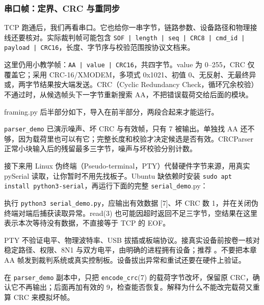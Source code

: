 \subsubsection{串口帧：定界、CRC 与重同步}
TCP 跑通后，我们再看串口。它也给你一串字节，链路参数、设备路径和物理接线还要核对。实际裁判帧可能包含 \texttt{SOF | length | seq | CRC8 | cmd\_id | payload | CRC16}，长度、字节序与校验范围按协议文档来。

这里仍用小教学帧：\texttt{AA | value | CRC16}，共四字节。value 为 0--255，CRC 仅覆盖它；采用 CRC-16/XMODEM，多项式 0x1021、初值 0、无反射、无最终异或，两字节结果按大端发送。CRC（Cyclic Redundancy Check，循环冗余校验）不通过时，从候选帧头下一字节重新搜索 AA，不把错误载荷交给后面的模块。
\begin{example}
framing.py 后半部分如下，导入在前半部分，两段合起来才能运行。
\begin{commcode}

\end{commcode}
\texttt{parser\_demo} 已演示噪声、坏 CRC 与有效帧，只有 7 被输出。单独找 AA 还不够，因为载荷里也可以有它；完整长度和校验才决定候选是否有效。CRCParser 正常小块输入后的残留最多三字节，噪声与坏校验分别计数。

接下来用 Linux 伪终端（Pseudo-terminal，PTY）代替硬件字节来源，用真实 pySerial 读取，让你暂时不用先找板子。Ubuntu 缺依赖时安装 \texttt{sudo apt install python3-serial}，再运行下面的完整 \texttt{serial\_demo}.py：
\begin{commcode}

\end{commcode}
执行 \texttt{python3 serial\_demo.py}，应输出有效数据 [7]、坏 CRC 数 1，并在关闭伪终端对端后捕获读取异常。read(3) 也可能因超时返回不足三字节，空结果在这里表示本次等待没有数据，不直接等于 TCP 的 EOF。
\begin{note}
PTY 不验证电平、物理波特率、USB 拔插或板端协议。接真实设备前按卷一核对稳定路径、权限、8N1 与双方电平，由明确的进程拥有设备；推荐 。不要把本章 AA 帧发到裁判系统或真实控制板。设备拔出异常和重试还要在硬件上验证。
\end{note}
\end{example}
\begin{exercise}\label{ex:v2-comm-crc}
在 \texttt{parser\_demo} 副本中，只把 \texttt{encode\_crc}(7) 的载荷字节改坏，保留原 CRC，确认它不再输出；后面再加有效的 9，检查能否恢复。解释为什么不能改完载荷又重算 CRC 来模拟坏帧。
\end{exercise}

